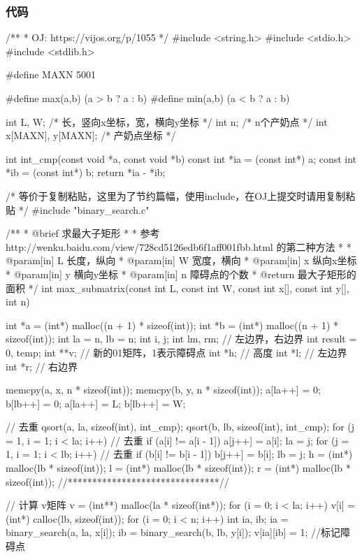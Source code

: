 \subsubsection{代码}
\begin{Codex}[label=cow_bath.c]
/**
 * OJ: https://vijos.org/p/1055
 */
#include <string.h>
#include <stdio.h>
#include <stdlib.h>

#define MAXN 5001

#define max(a,b)  (a > b ? a : b)
#define min(a,b)  (a < b ? a : b)

int L, W; /* 长，竖向x坐标，宽，横向y坐标 */
int n; /* n个产奶点 */
int x[MAXN], y[MAXN]; /* 产奶点坐标 */

int int_cmp(const void *a, const void *b) {
    const int *ia = (const int*) a;
    const int *ib = (const int*) b;
    return *ia - *ib;
}

/* 等价于复制粘贴，这里为了节约篇幅，使用include，在OJ上提交时请用复制粘贴 */
#include "binary_search.c"

/**
 * @brief 求最大子矩形
 *
 * 参考 http://wenku.baidu.com/view/728cd5126edb6f1aff001fbb.html 的第二种方法
 *
 * @param[in] L 长度，纵向
 * @param[in] W 宽度，横向
 * @param[in] x 纵向x坐标
 * @param[in] y 横向y坐标
 * @param[in] n 障碍点的个数
 * @return 最大子矩形的面积
 */
int max_submatrix(const int L, const int W,
        const int x[], const int y[], int n) {
    int *a = (int*) malloc((n + 1) * sizeof(int));
    int *b = (int*) malloc((n + 1) * sizeof(int));
    int la = n, lb = n;
    int i, j;
    int lm, rm; // 左边界，右边界
    int result = 0, temp;
    int **v;  // 新的01矩阵，1表示障碍点
    int *h;  // 高度
    int *l;  // 左边界
    int *r;  // 右边界

    memcpy(a, x, n * sizeof(int));
    memcpy(b, y, n * sizeof(int));
    a[la++] = 0;
    b[lb++] = 0;
    a[la++] = L;
    b[lb++] = W;

    // 去重
    qsort(a, la, sizeof(int), int_cmp);
    qsort(b, lb, sizeof(int), int_cmp);
    for (j = 1, i = 1; i < la; i++) { // 去重
        if (a[i] != a[i - 1])
            a[j++] = a[i];
    }
    la = j;
    for (j = 1, i = 1; i < lb; i++) { // 去重
        if (b[i] != b[i - 1])
            b[j++] = b[i];
    }
    lb = j;
    h = (int*) malloc(lb * sizeof(int));
    l = (int*) malloc(lb * sizeof(int));
    r = (int*) malloc(lb * sizeof(int));
    //*******************************//

    // 计算 v矩阵
    v = (int**) malloc(la * sizeof(int*));
    for (i = 0; i < la; i++) {
        v[i] = (int*) calloc(lb, sizeof(int));
    }
    for (i = 0; i < n; i++) {
        int ia, ib;
        ia = binary_search(a, la, x[i]);
        ib = binary_search(b, lb, y[i]);
        v[ia][ib] = 1; //标记障碍点
    }

}
\end{Codex}
